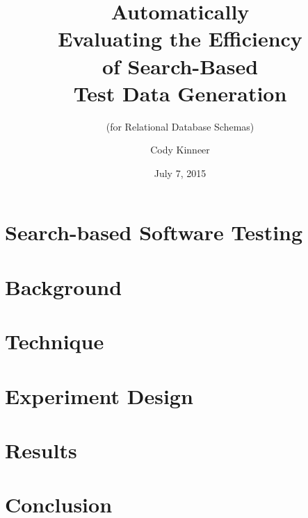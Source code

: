 \documentclass[hyperref]{beamer}
\title{Automatically \\ Evaluating the Efficiency \\ of Search-Based \\ Test
Data Generation %
}
\subtitle{(for Relational Database Schemas)}
\author[Kinneer]{Cody Kinneer}
\institute[SEKE 2015]{SEKE 2015}
\date[Feb 23, 2015]{July 7, 2015}
\begin{document}
\begin{frame}
  \titlepage
\end{frame}

\section{Search-based Software Testing}


\section{Background}


\section{Technique}


\section{Experiment Design}


\section{Results}


\section{Conclusion}

\end{document}
